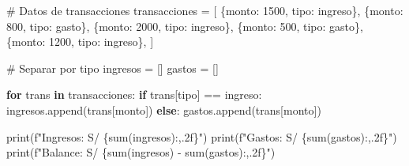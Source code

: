 \documentclass[
  doc,
  floatsintext,
  longtable,
  a4paper,
  nolmodern,
  notxfonts,
  notimes,
  12pt,
  colorlinks=true,linkcolor=blue,citecolor=blue,urlcolor=blue]{apa7}
\newenvironment{Shaded}{\begin{snugshade}}{\end{snugshade}}
\newcommand{\BuiltInTok}[1]{\textcolor[rgb]{0.00,0.23,0.31}{#1}}
\newcommand{\CommentTok}[1]{\textcolor[rgb]{0.37,0.37,0.37}{#1}}
\newcommand{\ControlFlowTok}[1]{\textcolor[rgb]{0.00,0.23,0.31}{\textbf{#1}}}
\newcommand{\DecValTok}[1]{\textcolor[rgb]{0.68,0.00,0.00}{#1}}
\newcommand{\KeywordTok}[1]{\textcolor[rgb]{0.00,0.23,0.31}{\textbf{#1}}}
\newcommand{\NormalTok}[1]{\textcolor[rgb]{0.00,0.23,0.31}{#1}}
\newcommand{\OperatorTok}[1]{\textcolor[rgb]{0.37,0.37,0.37}{#1}}
\newcommand{\SpecialCharTok}[1]{\textcolor[rgb]{0.37,0.37,0.37}{#1}}
\newcommand{\SpecialStringTok}[1]{\textcolor[rgb]{0.13,0.47,0.30}{#1}}
\newcommand{\StringTok}[1]{\textcolor[rgb]{0.13,0.47,0.30}{#1}}
\begin{document}
\begin{Shaded}
\begin{Highlighting}[]
\CommentTok{\# Datos de transacciones}
\NormalTok{transacciones }\OperatorTok{=}\NormalTok{ [}
\NormalTok{    \{}\StringTok{\textquotesingle{}monto\textquotesingle{}}\NormalTok{: }\DecValTok{1500}\NormalTok{, }\StringTok{\textquotesingle{}tipo\textquotesingle{}}\NormalTok{: }\StringTok{\textquotesingle{}ingreso\textquotesingle{}}\NormalTok{\},}
\NormalTok{    \{}\StringTok{\textquotesingle{}monto\textquotesingle{}}\NormalTok{: }\DecValTok{800}\NormalTok{, }\StringTok{\textquotesingle{}tipo\textquotesingle{}}\NormalTok{: }\StringTok{\textquotesingle{}gasto\textquotesingle{}}\NormalTok{\},}
\NormalTok{    \{}\StringTok{\textquotesingle{}monto\textquotesingle{}}\NormalTok{: }\DecValTok{2000}\NormalTok{, }\StringTok{\textquotesingle{}tipo\textquotesingle{}}\NormalTok{: }\StringTok{\textquotesingle{}ingreso\textquotesingle{}}\NormalTok{\},}
\NormalTok{    \{}\StringTok{\textquotesingle{}monto\textquotesingle{}}\NormalTok{: }\DecValTok{500}\NormalTok{, }\StringTok{\textquotesingle{}tipo\textquotesingle{}}\NormalTok{: }\StringTok{\textquotesingle{}gasto\textquotesingle{}}\NormalTok{\},}
\NormalTok{    \{}\StringTok{\textquotesingle{}monto\textquotesingle{}}\NormalTok{: }\DecValTok{1200}\NormalTok{, }\StringTok{\textquotesingle{}tipo\textquotesingle{}}\NormalTok{: }\StringTok{\textquotesingle{}ingreso\textquotesingle{}}\NormalTok{\},}
\NormalTok{]}

\CommentTok{\# Separar por tipo}
\NormalTok{ingresos }\OperatorTok{=}\NormalTok{ []}
\NormalTok{gastos }\OperatorTok{=}\NormalTok{ []}

\ControlFlowTok{for}\NormalTok{ trans }\KeywordTok{in}\NormalTok{ transacciones:}
    \ControlFlowTok{if}\NormalTok{ trans[}\StringTok{\textquotesingle{}tipo\textquotesingle{}}\NormalTok{] }\OperatorTok{==} \StringTok{\textquotesingle{}ingreso\textquotesingle{}}\NormalTok{:}
\NormalTok{        ingresos.append(trans[}\StringTok{\textquotesingle{}monto\textquotesingle{}}\NormalTok{])}
    \ControlFlowTok{else}\NormalTok{:}
\NormalTok{        gastos.append(trans[}\StringTok{\textquotesingle{}monto\textquotesingle{}}\NormalTok{])}

\BuiltInTok{print}\NormalTok{(}\SpecialStringTok{f"Ingresos: S/ }\SpecialCharTok{\{}\BuiltInTok{sum}\NormalTok{(ingresos)}\SpecialCharTok{:,.2f\}}\SpecialStringTok{"}\NormalTok{)}
\BuiltInTok{print}\NormalTok{(}\SpecialStringTok{f"Gastos: S/ }\SpecialCharTok{\{}\BuiltInTok{sum}\NormalTok{(gastos)}\SpecialCharTok{:,.2f\}}\SpecialStringTok{"}\NormalTok{)}
\BuiltInTok{print}\NormalTok{(}\SpecialStringTok{f"Balance: S/ }\SpecialCharTok{\{}\BuiltInTok{sum}\NormalTok{(ingresos) }\OperatorTok{{-}} \BuiltInTok{sum}\NormalTok{(gastos)}\SpecialCharTok{:,.2f\}}\SpecialStringTok{"}\NormalTok{)}


\end{Highlighting}
\end{Shaded}
\end{document}
